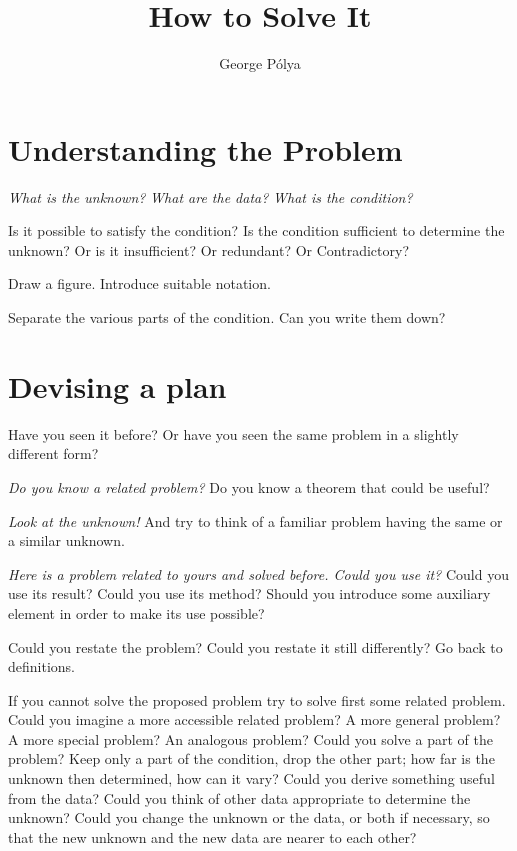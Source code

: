 \documentclass[11pt]{article}
\date{\vspace{-1em}}
\title{How to Solve It}
\author{George P\'{o}lya}
\begin{document}
\maketitle

\section*{Understanding the Problem}

\emph{What is the unknown?}
\emph{What are the data?}
\emph{What is the condition?}

Is it possible to satisfy the condition? Is the condition sufficient to determine the unknown? Or is it insufficient? Or redundant? Or Contradictory?

Draw a figure.
Introduce suitable notation.

Separate the various parts of the condition.
Can you write them down?

\section*{Devising a plan}

Have you seen it before?
Or have you seen the same problem in a slightly different form?

\emph{Do you know a related problem?}
Do you know a theorem that could be useful?

\emph{Look at the unknown!} And try to think of a familiar problem having the same or a similar unknown.

\emph{Here is a problem related to yours and solved before. Could you use it?}
Could you use its result?
Could you use its method?
Should you introduce some auxiliary element in order to make its use possible?

Could you restate the problem?
Could you restate it still differently?
Go back to definitions.

If you cannot solve the proposed problem try to solve first some related problem.
Could you imagine a more accessible related problem?
A more general problem?
A more special problem?
An analogous problem?
Could you solve a part of the problem?
Keep only a part of the condition, drop the other part; how far is the unknown then determined, how can it vary?
Could you derive something useful from the data?
Could you think of other data appropriate to determine the unknown?
Could you change the unknown or the data, or both if necessary, so that the new unknown and the new data are nearer to each other?
\end{document}
